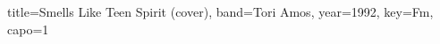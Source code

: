 \documentclass{../../tex/bekki-leadsheet}
\begin{document}
\begin{song}[transpose-capo=true]{title={Smells Like Teen Spirit (cover)}, band={Tori Amos}, year={1992}, key={Fm}, capo={1}}

  

\end{song}
\end{document}
